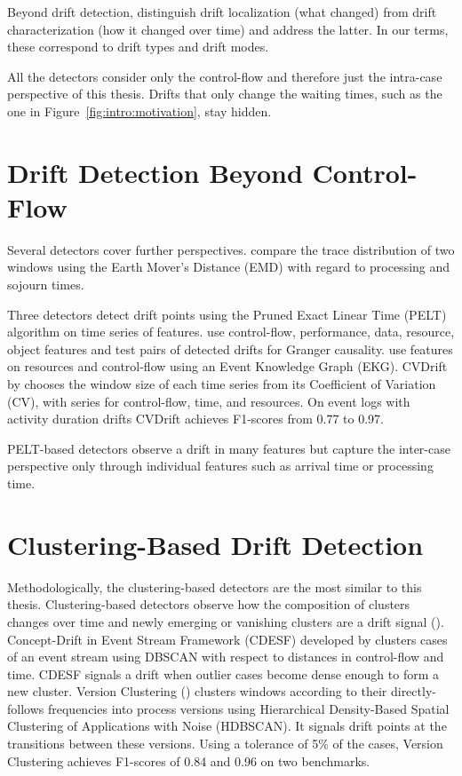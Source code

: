 Beyond drift detection, \textcite{kraus2026characterization} distinguish drift localization (what changed) from drift characterization (how it changed over time) and address the latter. In our terms, these correspond to drift types and drift modes.

All the detectors consider only the control-flow and therefore just the intra-case perspective of this thesis. Drifts that only change the waiting times, such as the one in Figure~\ref{fig:intro:motivation}, stay hidden.

\section{Drift Detection Beyond Control-Flow}
\label{sec:related_work:perspectives}
Several detectors cover further perspectives. \textcite{brockhoff2020time} compare the trace distribution of two windows using the Earth Mover's Distance (EMD) with regard to processing and sojourn times.

Three detectors detect drift points using the Pruned Exact Linear Time (PELT) algorithm on time series of features. \textcite{adams2023explainable} use control-flow, performance, data, resource, object features and test pairs of detected drifts for Granger causality. \textcite{klijn2024multi} use features on resources and control-flow using an Event Knowledge Graph (EKG). CVDrift by \textcite{khraiwesh2027window} chooses the window size of each time series from its Coefficient of Variation (CV), with series for control-flow, time, and resources. On event logs with activity duration drifts CVDrift achieves F1-scores from 0.77 to 0.97.

PELT-based detectors observe a drift in many features but capture the inter-case perspective only through individual features such as arrival time or processing time.

\section{Clustering-Based Drift Detection}
\label{sec:related_work:clustering}
Methodologically, the clustering-based detectors are the most similar to this thesis. Clustering-based detectors observe how the composition of clusters changes over time and newly emerging or vanishing clusters are a drift signal (\textcite{sato2022survey}). Concept-Drift in Event Stream Framework (CDESF) developed by \textcite{barbonjunior2018framework} clusters cases of an event stream using DBSCAN with respect to distances in control-flow and time. CDESF signals a drift when outlier cases become dense enough to form a new cluster. Version Clustering (\textcite{abarcazuniga2026version}) clusters windows according to their directly-follows frequencies into process versions using Hierarchical Density-Based Spatial Clustering of Applications with Noise (HDBSCAN). It signals drift points at the transitions between these versions. Using a tolerance of 5\% of the cases, Version Clustering achieves F1-scores of 0.84 and 0.96 on two benchmarks.

